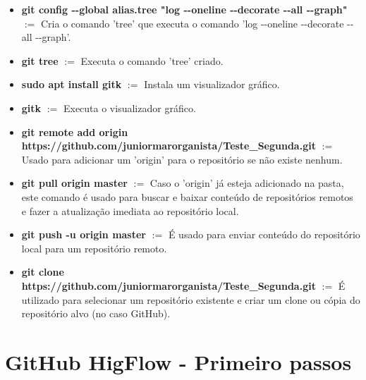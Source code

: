 \documentclass[12pt]{article}
\begin{document}
\begin{itemize}
	\item \textbf{git config -\hspace{0.5mm}-global alias.tree "log -\hspace{0.5mm}-oneline -\hspace{0.5mm}-decorate -\hspace{0.5mm}-all -\hspace{0.5mm}-graph"} $:=$ Cria o comando 'tree' que executa o comando 'log -\hspace{0.5mm}-oneline -\hspace{0.5mm}-decorate -\hspace{0.5mm}-all -\hspace{0.5mm}-graph'.
	
	\item \textbf{git tree} $:=$ Executa o comando 'tree' criado.
	
	\item \textbf{sudo apt install gitk} $:=$ Instala um visualizador gráfico.
	
	\item \textbf{gitk} $:=$ Executa o visualizador gráfico.
	
	\item \textbf{git remote add origin https://github.com/juniormarorganista/Teste\_Segunda.git} $:=$ Usado para adicionar um 'origin' para o repositório se não existe nenhum.
	
	\item \textbf{git pull origin master} $:=$ Caso o 'origin' já esteja adicionado na pasta, este comando é usado para buscar e baixar conteúdo de repositórios remotos e fazer a atualização imediata ao repositório local.
	
	\item \textbf{git push -u origin master} $:=$ É usado para enviar conteúdo do repositório local para um repositório remoto.
	
	\item \textbf{git clone https://github.com/juniormarorganista/Teste\_Segunda.git} $:=$ É utilizado para selecionar um repositório existente e criar um clone ou cópia do repositório alvo (no caso GitHub).
	
\end{itemize}

\section{GitHub HigFlow - Primeiro passos}\label{sec:github_higflow}
\end{document}
